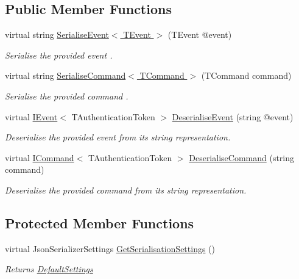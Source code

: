 \subsection*{Public Member Functions}
\begin{DoxyCompactItemize}
\item 
virtual string \hyperlink{classCqrs_1_1Azure_1_1ServiceBus_1_1MessageSerialiser_a5650683271dec423489b016da15d8d3d_a5650683271dec423489b016da15d8d3d}{Serialise\+Event$<$ T\+Event $>$} (T\+Event @event)
\begin{DoxyCompactList}\small\item\em Serialise the provided {\itshape event} . \end{DoxyCompactList}\item 
virtual string \hyperlink{classCqrs_1_1Azure_1_1ServiceBus_1_1MessageSerialiser_a72ab8d3bd734eeb4ae80d3dcd36fa7e7_a72ab8d3bd734eeb4ae80d3dcd36fa7e7}{Serialise\+Command$<$ T\+Command $>$} (T\+Command command)
\begin{DoxyCompactList}\small\item\em Serialise the provided {\itshape command} . \end{DoxyCompactList}\item 
virtual \hyperlink{interfaceCqrs_1_1Events_1_1IEvent}{I\+Event}$<$ T\+Authentication\+Token $>$ \hyperlink{classCqrs_1_1Azure_1_1ServiceBus_1_1MessageSerialiser_a9207c867f358e352eee5d3727fe620e4_a9207c867f358e352eee5d3727fe620e4}{Deserialise\+Event} (string @event)
\begin{DoxyCompactList}\small\item\em Deserialise the provided {\itshape event}  from its string representation. \end{DoxyCompactList}\item 
virtual \hyperlink{interfaceCqrs_1_1Commands_1_1ICommand}{I\+Command}$<$ T\+Authentication\+Token $>$ \hyperlink{classCqrs_1_1Azure_1_1ServiceBus_1_1MessageSerialiser_af08efd7ea85a4fefd54df34dd9481f95_af08efd7ea85a4fefd54df34dd9481f95}{Deserialise\+Command} (string command)
\begin{DoxyCompactList}\small\item\em Deserialise the provided {\itshape command}  from its string representation. \end{DoxyCompactList}\end{DoxyCompactItemize}
\subsection*{Protected Member Functions}
\begin{DoxyCompactItemize}
\item 
virtual Json\+Serializer\+Settings \hyperlink{classCqrs_1_1Azure_1_1ServiceBus_1_1MessageSerialiser_aca8f19355749092a6ad7b5085dc7f057_aca8f19355749092a6ad7b5085dc7f057}{Get\+Serialisation\+Settings} ()
\begin{DoxyCompactList}\small\item\em Returns \hyperlink{classCqrs_1_1Azure_1_1ServiceBus_1_1MessageSerialiser_a71ebae2d4d6352b19b49bd0115b99fcf_a71ebae2d4d6352b19b49bd0115b99fcf}{Default\+Settings} \end{DoxyCompactList}\end{DoxyCompactItemize}
